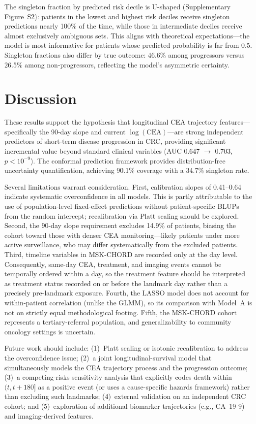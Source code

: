 \documentclass[11pt]{article}
\begin{document}
The singleton fraction by predicted risk decile is U-shaped (Supplementary Figure~S2): patients in the lowest and highest risk deciles receive singleton predictions nearly 100\% of the time, while those in intermediate deciles receive almost exclusively ambiguous sets. This aligns with theoretical expectations---the model is most informative for patients whose predicted probability is far from 0.5. Singleton fractions also differ by true outcome: 46.6\% among progressors versus 26.5\% among non-progressors, reflecting the model's asymmetric certainty.

\section{Discussion}

These results support the hypothesis that longitudinal CEA trajectory features---specifically the 90-day slope and current $\log(\text{CEA})$---are strong independent predictors of short-term disease progression in CRC, providing significant incremental value beyond standard clinical variables (AUC 0.647 $\to$ 0.703, $p < 10^{-9}$). The conformal prediction framework provides distribution-free uncertainty quantification, achieving 90.1\% coverage with a 34.7\% singleton rate.

Several limitations warrant consideration. First, calibration slopes of 0.41--0.64 indicate systematic overconfidence in all models. This is partly attributable to the use of population-level fixed-effect predictions without patient-specific BLUPs from the random intercept; recalibration via Platt scaling should be explored. Second, the 90-day slope requirement excludes 14.9\% of patients, biasing the cohort toward those with denser CEA monitoring---likely patients under more active surveillance, who may differ systematically from the excluded patients. Third, timeline variables in MSK-CHORD are recorded only at the day level. Consequently, same-day CEA, treatment, and imaging events cannot be temporally ordered within a day, so the treatment feature should be interpreted as treatment status recorded on or before the landmark day rather than a precisely pre-landmark exposure. Fourth, the LASSO model does not account for within-patient correlation (unlike the GLMM), so its comparison with Model~A is not on strictly equal methodological footing. Fifth, the MSK-CHORD cohort represents a tertiary-referral population, and generalizability to community oncology settings is uncertain.

Future work should include: (1)~Platt scaling or isotonic recalibration to address the overconfidence issue; (2)~a joint longitudinal-survival model that simultaneously models the CEA trajectory process and the progression outcome; (3)~a competing-risks sensitivity analysis that explicitly codes death within $(t, t + 180]$ as a positive event (or uses a cause-specific hazards framework) rather than excluding such landmarks; (4)~external validation on an independent CRC cohort; and (5)~exploration of additional biomarker trajectories (e.g., CA~19-9) and imaging-derived features.
\end{document}
